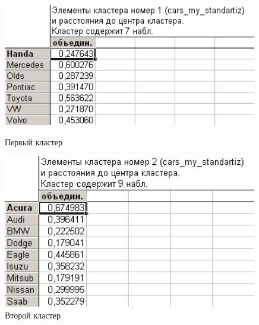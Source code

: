 \begin{figure}[!h]
  \centering
  \begin{minipage}{0.49\textwidth}
    \centering

    \includegraphics[width=0.99\textwidth]
    {inc/cars_my/2.5.PNG}

    \caption{Первый кластер}
    \label{fig:2_5}
  \end{minipage}
  \begin{minipage}{0.49\textwidth}
    \centering

    \includegraphics[width=0.99\textwidth]
    {inc/cars_my/2.6.PNG}

    \caption{Второй кластер}
    \label{fig:2_6}
  \end{minipage}
\end{figure}

